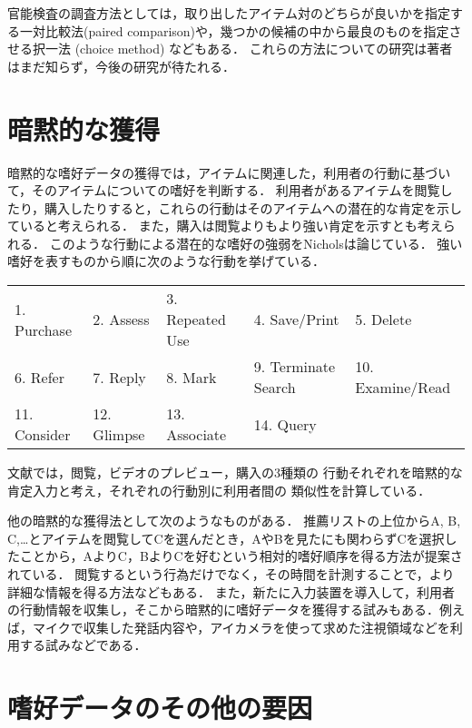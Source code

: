 官能検査の調査方法としては，取り出したアイテム対のどちらが良いかを指定する一対比較法(paired comparison)や，幾つかの候補の中から最良のものを指定させる択一法 (choice method) などもある．
これらの方法についての研究は著者はまだ知らず，今後の研究が待たれる．

\section{暗黙的な獲得}
\label{sec:implicitrating}

暗黙的な嗜好データの獲得では，アイテムに関連した，利用者の行動に基づいて，そのアイテムについての嗜好を判断する．
利用者があるアイテムを閲覧したり，購入したりすると，これらの行動はそのアイテムへの潜在的な肯定を示していると考えられる．
また，購入は閲覧よりもより強い肯定を示すとも考えられる．
このような行動による潜在的な嗜好の強弱をNicholsは論じている\cite{misc:088,ej:048}．
強い嗜好を表すものから順に次のような行動を挙げている．
\begin{center}
\small
\begin{tabular}{lllll}
1. Purchase & 2. Assess & 3. Repeated Use & 4. Save/Print &  5. Delete \\
6. Refer & 7. Reply & 8. Mark & 9. Terminate Search & 10. Examine/Read \\
11. Consider & 12. Glimpse & 13. Associate & 14. Query
\end{tabular}
\end{center}
文献\cite{ieeem:07:01}では，閲覧，ビデオのプレビュー，購入の3種類の
行動それぞれを暗黙的な肯定入力と考え，それぞれの行動別に利用者間の
類似性を計算している．

他の暗黙的な獲得法として次のようなものがある．
推薦リストの上位からA, B, C,…とアイテムを閲覧してCを選んだとき，AやBを見たにも関わらずCを選択したことから，AよりC，BよりCを好むという相対的嗜好順序を得る方法\cite{kdd:02:01}が提案されている．
閲覧するという行為だけでなく，その時間を計測することで，より詳細な情報を得る方法などもある．
また，新たに入力装置を導入して，利用者の行動情報を収集し，そこから暗黙的に嗜好データを獲得する試みもある．例えば，マイクで収集した発話内容\cite{trjsai:07:01}や，アイカメラを使って求めた注視領域\cite{trjsai:07:02}などを利用する試みなどである．

\section{嗜好データのその他の要因}
\label{sec:getprefother}

